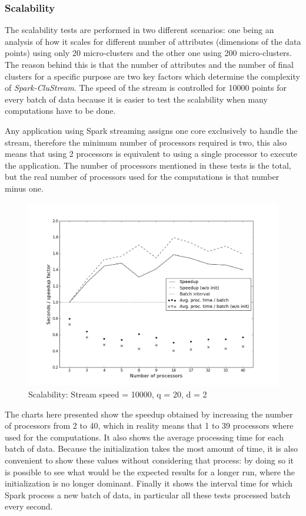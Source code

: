 \subsubsection{Scalability}
\label{sec:expScalability}
The scalability tests are performed in two different scenarios: one being an analysis of how it scales for different number of attributes (dimensions of the data points) using only 20 micro-clusters and the other one using 200 micro-clusters. The reason behind this is that the number of attributes and the number of final clusters for a specific purpose are two key factors which determine the complexity of \textit{Spark-CluStream}. The speed of the stream is controlled for 10000 points for every batch of data because it is easier to test the scalability when many computations have to be done.

Any application using Spark streaming assigns one core exclusively to handle the stream, therefore the minimum number of processors required is two, this also means that using 2 processors is equivalent to using a single processor to execute the application. The number of processors mentioned in these tests is the total, but the real number of processors used for the computations is that number minus one.

\begin{figure}[h!]
 \centering
 \includegraphics[scale=0.39]{./styles/perf20-2.png}
 \caption{Scalability: Stream speed = 10000, q = 20, d = 2}
 \label{fig:perf20-2}
\end{figure}


The charts here presented show the speedup obtained by increasing the number of processors from 2 to 40, which in reality means that 1 to 39 processors where used for the computations. It also shows the average processing time for each batch of data. Because the initialization takes the most amount of time, it is also convenient to show these values without considering that process: by doing so it is possible to see what would be the expected results for a longer run, where the initialization is no longer dominant. Finally it shows the interval time for which Spark process a new batch of data, in particular all these tests processed batch every second.



